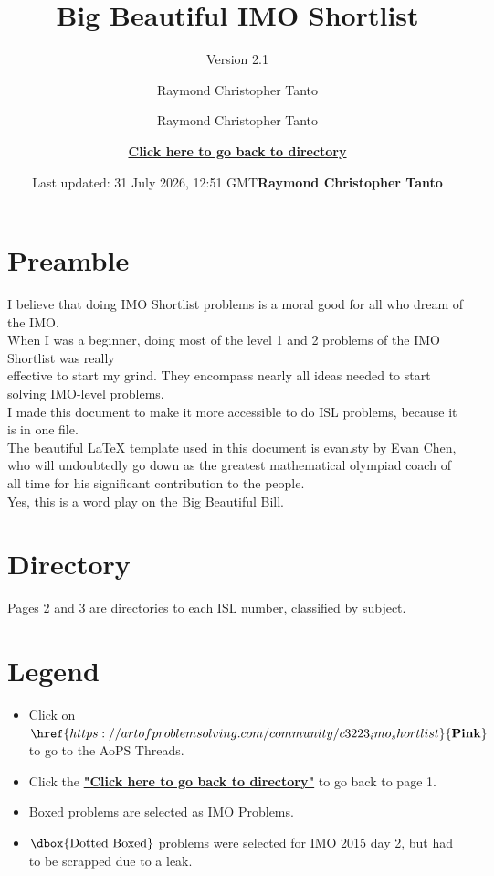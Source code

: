 \documentclass[11pt]{scrartcl}
\author{Raymond Christopher Tanto}
\title{\textbf{Big Beautiful IMO Shortlist} }
\subtitle{Version 2.1}
\date{Last updated: 31 July 2026, 12:51 GMT}
\begin{document}
\author{Raymond Christopher Tanto}
\maketitle

\author{ \hyperref[Back]{\textbf{Click here to go back to directory}} }
\date{\textbf{Raymond Christopher Tanto}}

\section*{Preamble}
I believe that doing IMO Shortlist problems is a moral good for all who dream of the IMO.\\
When I was a beginner, doing most of the level 1 and 2 problems of the IMO Shortlist was really\\ effective to start my grind. They encompass nearly all ideas needed to start solving IMO-level problems.\\
I made this document to make it more accessible to do ISL problems, because it is in one file.\\
The beautiful LaTeX template used in this document is evan.sty by Evan Chen, who will undoubtedly go down as the greatest mathematical olympiad coach of all time for his significant contribution to the people. \\
Yes, this is a word play on the Big Beautiful Bill.
\section*{Directory} \label{Back} 
Pages 2 and 3 are directories to each ISL number, classified by subject.
\section*{Legend}
\begin{itemize}[leftmargin=*]
    \item Click on $\href{https://artofproblemsolving.com/community/c3223_imo_shortlist}{\textbf{Pink}}$ to go to the AoPS Threads.
    \item Click the \hyperref[Back]{\textbf{"Click here to go back to directory"}} to go back to page 1.
    \item $\boxed{\text{Boxed}}$ problems are selected as IMO Problems.
    \item $\dbox{\text{Dotted Boxed}}$ problems were selected for IMO 2015 day 2, but had to be scrapped due to a leak.
\end{itemize}
\end{document}
